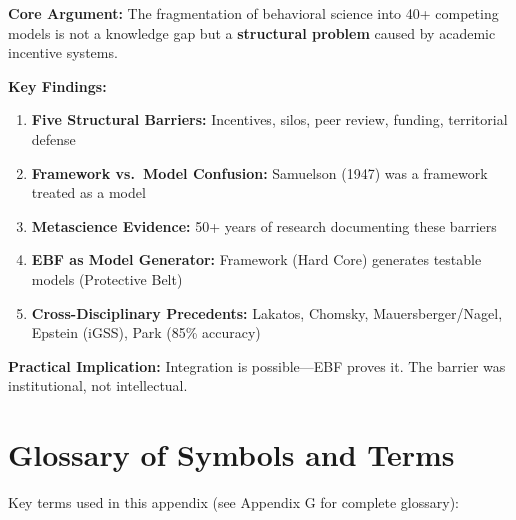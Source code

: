 \begin{tcolorbox}[colback=blue!5!white, colframe=blue!75!black,
    title=\textbf{Chapter Summary}]

\textbf{Core Argument:}
The fragmentation of behavioral science into 40+ competing models is not a knowledge gap
but a \textbf{structural problem} caused by academic incentive systems.

\textbf{Key Findings:}
\begin{enumerate}[nosep]
    \item \textbf{Five Structural Barriers:} Incentives, silos, peer review, funding, territorial defense
    \item \textbf{Framework vs.\ Model Confusion:} Samuelson (1947) was a framework treated as a model
    \item \textbf{Metascience Evidence:} 50+ years of research documenting these barriers
    \item \textbf{EBF as Model Generator:} Framework (Hard Core) generates testable models (Protective Belt)
    \item \textbf{Cross-Disciplinary Precedents:} Lakatos, Chomsky, Mauersberger/Nagel, Epstein (iGSS), Park (85\% accuracy)
\end{enumerate}

\textbf{Practical Implication:}
Integration is possible—EBF proves it. The barrier was institutional, not intellectual.

\end{tcolorbox}


\section{Glossary of Symbols and Terms}
\label{sec:meta-glossary}

Key terms used in this appendix (see Appendix G for complete glossary):

